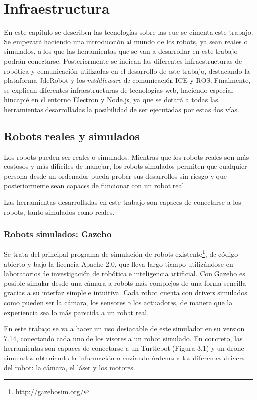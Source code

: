 \chapter{Infraestructura}\label{cap.infraestructura}
En este capítulo se describen las tecnologías sobre las que se cimenta este trabajo. Se empezará haciendo una introducción al mundo de los robots, ya sean reales o simulados, a los que las herramientas que se van a desarrollar en este trabajo podrán conectarse. Posteriormente se indican las diferentes infraestructuras de robótica y comunicación utilizadas en el desarrollo de este trabajo, destacando la plataforma JdeRobot y los \textit{middleware} de comunicación ICE y ROS. Finalmente, se explican diferentes infraestructuras de tecnologías web, haciendo especial hincapié en el entorno Electron y Node.js, ya que se dotará a todas las herramientas desarrolladas la posibilidad de ser ejecutadas por estas dos vías.

\section{Robots reales y simulados}
Los robots pueden ser reales o simulados. Mientras que los robots reales son más costosos y más difíciles de manejar, los robots simulados permiten que cualquier persona desde un ordenador pueda probar sus desarrollos sin riesgo y que posteriormente sean capaces de funcionar con un robot real.

Las herramientas desarrolladas en este trabajo son capaces de conectarse a los robots, tanto simulados como reales.

\subsection{Robots simulados: Gazebo}
Se trata del principal programa de simulación de robots existente\footnote{\url{http://gazebosim.org/}}, de código abierto y bajo la licencia Apache 2.0, que lleva largo tiempo utilizándose en laboratorios de investigación de robótica e inteligencia artificial. Con Gazebo es posible simular desde una cámara a robots más complejos de una forma sencilla gracias a su interfaz simple e intuitiva. Cada robot cuenta con drivers simulados como pueden ser la cámara, los sensores o los actuadores, de manera que la experiencia sea lo más parecida a un robot real.

En este trabajo se va a hacer un uso destacable de este simulador en su version 7.14, conectando cada uno de los visores a un robot simulado. En concreto, las herramientas son capaces de conectarse a un Turtlebot (Figura 3.1) y un drone simulados obteniendo la información o enviando órdenes a los diferentes drivers del robot: la cámara, el láser y los motores.

